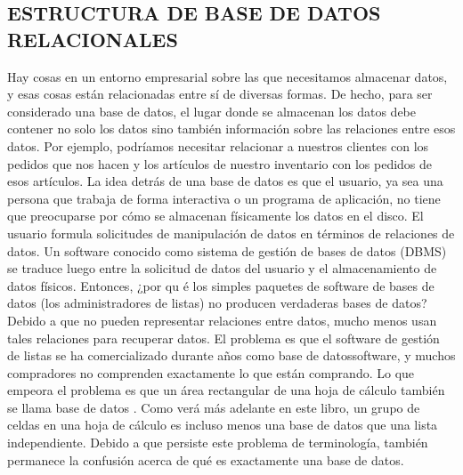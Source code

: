 \documentclass[twoside,twocolumn]{article}
\begin{document}
\subsection{ESTRUCTURA DE BASE DE DATOS RELACIONALES}
Hay cosas en un entorno empresarial sobre las que necesitamos almacenar datos, y esas cosas están relacionadas entre sí de diversas formas. De hecho, para ser considerado una base de datos, el lugar donde se almacenan los datos debe contener no solo los datos sino también información sobre las relaciones entre esos datos. Por ejemplo, podríamos necesitar relacionar a nuestros clientes con los pedidos que nos hacen y los artículos de nuestro inventario con los pedidos de esos artículos.
La idea detrás de una base de datos es que el usuario, ya sea una persona que trabaja de forma interactiva o un programa de aplicación, no tiene que preocuparse por cómo se almacenan físicamente los datos en el disco. El usuario formula solicitudes de manipulación de datos en términos de relaciones de datos. Un software conocido como sistema de gestión de bases de datos (DBMS) se traduce luego entre la solicitud de datos del usuario y el almacenamiento de datos físicos.
Entonces, ¿por qu
é los simples paquetes de software de bases de datos (los administradores de listas) no producen verdaderas bases de datos? Debido a que no pueden representar relaciones entre datos, mucho menos usan tales relaciones para recuperar datos. El problema es que el software de gestión de listas se ha comercializado durante años como base de datossoftware, y muchos compradores no comprenden exactamente lo que están comprando. Lo que empeora el problema es que un área rectangular de una hoja de cálculo también se llama base de datos . Como verá más adelante en este libro, un grupo de celdas en una hoja de cálculo es incluso menos una base de datos que una lista independiente. Debido a que persiste este problema de terminología, también permanece la confusión acerca de qué es exactamente una base de datos.
\end{document}
